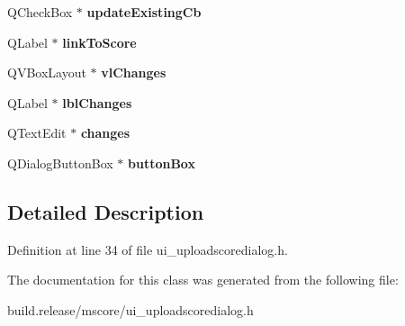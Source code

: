 \begin{DoxyCompactItemize}
\mbox{\label{class_ui___upload_score_dialog_a31c5977225331d981e4cb19d0b37bba4}} 
Q\+Check\+Box $\ast$ {\bfseries update\+Existing\+Cb}
\item 
\mbox{\label{class_ui___upload_score_dialog_a7dd3275639a3586d4dbaa08cba4d6797}} 
Q\+Label $\ast$ {\bfseries link\+To\+Score}
\item 
\mbox{\label{class_ui___upload_score_dialog_a0403650815df6a54dee77ce684283e89}} 
Q\+V\+Box\+Layout $\ast$ {\bfseries vl\+Changes}
\item 
\mbox{\label{class_ui___upload_score_dialog_a44c0eb61e6f785c2fd5d2a7007fb9399}} 
Q\+Label $\ast$ {\bfseries lbl\+Changes}
\item 
\mbox{\label{class_ui___upload_score_dialog_a51512d0859f3844ba17970b1b708ebca}} 
Q\+Text\+Edit $\ast$ {\bfseries changes}
\item 
\mbox{\label{class_ui___upload_score_dialog_ab072d63839a3651ac7fefa91f6a3b420}} 
Q\+Dialog\+Button\+Box $\ast$ {\bfseries button\+Box}
\end{DoxyCompactItemize}


\subsection{Detailed Description}


Definition at line 34 of file ui\+\_\+uploadscoredialog.\+h.



The documentation for this class was generated from the following file\+:\begin{DoxyCompactItemize}
\item 
build.\+release/mscore/ui\+\_\+uploadscoredialog.\+h\end{DoxyCompactItemize}
